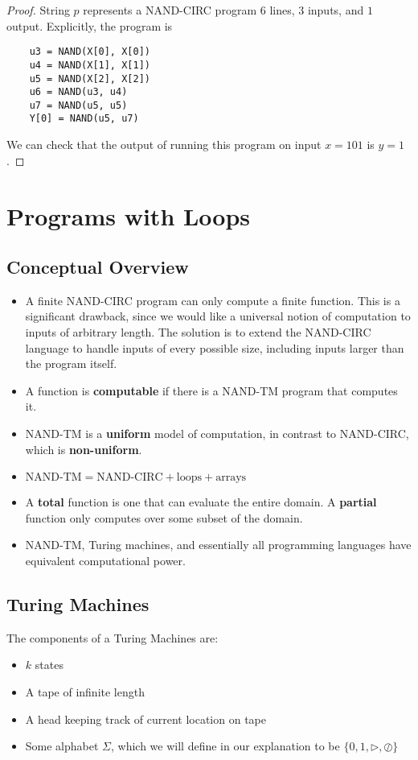\documentclass[11pt]{article}
\theoremstyle{definition}
\theoremstyle{remark}
\begin{document}
\begin{proof} String $p$ represents a NAND-CIRC program $6$ lines, $3$ inputs, and $1$ output. Explicitly, the program is

\begin{verbatim}
    u3 = NAND(X[0], X[0])
    u4 = NAND(X[1], X[1])
    u5 = NAND(X[2], X[2])
    u6 = NAND(u3, u4)
    u7 = NAND(u5, u5)
    Y[0] = NAND(u5, u7)
\end{verbatim}

We can check that the output of running this program on input $x = 101$ is $y = 1$.
\end{proof}

\section{Programs with Loops}

\subsection{Conceptual Overview}

\begin{itemize}
   
\item A finite NAND-CIRC program can only compute a finite function. This is a significant drawback, since we would like a universal notion of computation to inputs of arbitrary length. The solution is to extend the NAND-CIRC language to handle inputs of every possible size, including inputs larger than the program itself. 
\item A function is \textbf{computable} if there is a NAND-TM program that computes it.
\item NAND-TM is a \textbf{uniform} model of computation, in contrast to NAND-CIRC, which is \textbf{non-uniform}. 
\item $ \text{NAND-TM} = \text{NAND-CIRC} + \text{loops} + \text{arrays}$
\item A \textbf{total} function is one that can evaluate the entire domain. A \textbf{partial} function only computes over some subset of the domain.
\item NAND-TM, Turing machines, and essentially all programming languages have equivalent computational power.
\end{itemize}

\subsection{Turing Machines}
The components of a Turing Machines are: 
\begin{itemize}
	\item $k$ states
	\item A tape of infinite length
	\item A head keeping track of current location on tape
	\item Some alphabet $\Sigma$, which we will define in our explanation to be $\{0, 1, \triangleright, \oslash\}$
\end{itemize}
\end{document}
